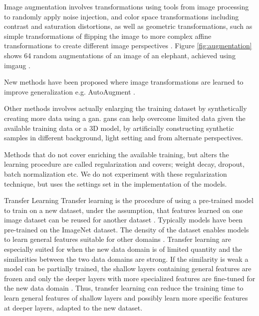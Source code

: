 \begin{enumdescript}
\begin{enumdescript}
		Image augmentation involves transformations using tools from image processing to randomly apply noise injection, and color space transformations including contrast and saturation distortions, as well as geometric transformations, such as simple transformations of flipping the image to more complex affine transformations to create different image perspectives \cite{shorten_survey_2019}. Figure \ref{fig:augmentation} shows 64 random augmentations of an image of an elephant, achieved using \gls{imgaug} \cite{jung_imgaug:_nodate}. 
		
		New methods have been proposed where image transformations are learned to improve generalization e.g. AutoAugment \cite{cubuk_autoaugment:_2018}. 
		
		Other methods involves actually enlarging the training dataset by synthetically creating more data using a \gls{gan}. \gls{gan}s can help overcome limited data given the available training data or a 3D model, by artificially constructing synthetic samples in different background, light setting and from alternate perspectives.
		
		Methods that do not cover enriching the available training, but alters the learning procedure are called regularization and covers; weight decay, dropout, batch normalization etc. We do not experiment with these regularization technique, but uses the settings set in the implementation of the models.
		
		\item[Transfer Learning] Transfer learning is the procedure of using a pre-trained model to train on a new dataset, under the assumption, that features learned on one image dataset can be reused for another dataset \cite{yosinski_how_2014}. Typically models have been pre-trained on the ImageNet dataset. The density of the dataset enables models to learn general features suitable for other domains \cite{kornblith_better_2019}. Transfer learning are especially suited for when the new data domain is of limited quantity and the similarities between the two data domains are strong. If the similarity is weak a model can be partially trained, the shallow layers containing general features are frozen and only the deeper layers with more specialized features are fine-tuned for the new data domain \cite{li_cs231n:_2018}. Thus, transfer learning can reduce the training time to learn general features of shallow layers and possibly learn more specific features at deeper layers, adapted to the new dataset.
	\end{enumdescript}
	

\end{enumdescript}
